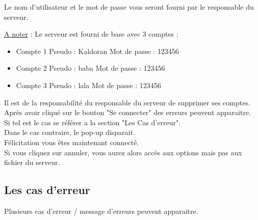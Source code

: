 \documentclass[12pt,a4paper]{article}
\begin{document}
Le nom d'utilisateur et le mot de passe vous seront fourni par le responsable du serveur.

\underline{A noter} : Le serveur est fourni de base avec 3 comptes : \\
\begin{itemize}
	\item Compte 1
		\subitem Pseudo : Kaldoran 
		\subitem Mot de passe : 123456 
	\item Compte 2
		\subitem Pseudo : baba
		\subitem Mot de passe : 123456
	\item Compte 3
		\subitem Pseudo : lala
		\subitem Mot de passe : 123456
\end{itemize}

Il est de la responsabilité du responsable du serveur de supprimer ses comptes. \\

Après avoir cliqué sur le bouton "Se connecter" des erreurs peuvent apparaitre. \\
Si tel est le cas se référer a la section "Les Cas d'erreur". \\

Dans le cas contraire, le pop-up disparait. \\
Félicitation vous êtes maintenant connecté. \\

Si vous cliquez sur annuler, vous aurez alors accès aux options mais pas aux fichier du serveur.
\subsection{Les cas d'erreur}

Plusieurs cas d'erreur / message d'erreurs peuvent apparaitre. \\
\end{document}
